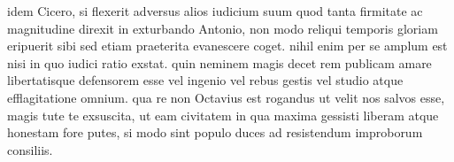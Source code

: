  idem Cicero, si flexerit adversus alios iudicium suum quod tanta firmitate ac magnitudine direxit in exturbando Antonio, non modo reliqui temporis gloriam eripuerit sibi sed etiam praeterita evanescere coget. nihil enim per se amplum est nisi in quo iudici ratio exstat. quin neminem magis decet rem publicam amare libertatisque defensorem esse vel ingenio vel rebus gestis vel studio atque efflagitatione omnium. qua re non Octavius est rogandus ut velit nos salvos esse, magis tute te exsuscita, ut eam civitatem in qua maxima gessisti liberam atque honestam fore putes, si modo sint populo duces ad resistendum improborum consiliis.
